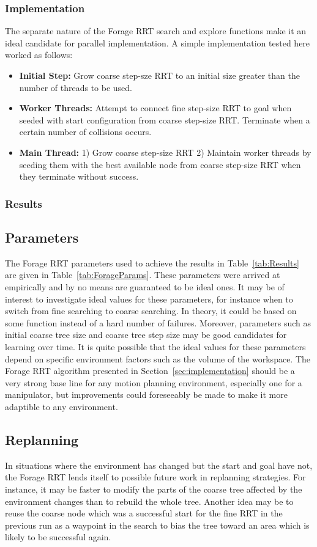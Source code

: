 \documentclass[conference]{IEEEtran}
\begin{document}
\subsubsection{Implementation}
The separate nature of the Forage RRT search and explore functions make it an ideal candidate for parallel implementation. A simple
implementation tested here worked as follows:
\begin{itemize}
\item \textbf{Initial Step: } Grow coarse step-sze RRT to an initial size greater than the number of threads to be used.
\item \textbf{Worker Threads: } Attempt to connect fine step-size RRT to goal when seeded with start configuration from coarse step-size
RRT. Terminate when a certain number of collisions occurs.
\item \textbf{Main Thread: } 1) Grow coarse step-size RRT 2) Maintain worker threads by seeding them with the best available node from
coarse step-size RRT when they terminate without success.
\end{itemize}

\subsubsection{Results}


\subsection{Parameters}
The Forage RRT parameters used to achieve the results in Table~\ref{tab:Results} are given in Table~\ref{tab:ForageParams}. These parameters
were arrived at empirically and by no means are guaranteed to be ideal ones. It may be of interest to investigate ideal values for these
parameters, for instance when to switch from fine searching to coarse searching. In theory, it could be based on some function instead of a
hard number of failures. Moreover, parameters such as initial coarse tree size and coarse tree step size may be good candidates for learning
over time. It is quite possible that the ideal values for these parameters depend on specific environment factors such as the volume of the
workspace. The Forage RRT algorithm presented in Section~\ref{sec:implementation} should be a very strong base line for any motion planning
environment, especially one for a manipulator, but improvements could foreseeably be made to make it more adaptible to any environment.

\subsection{Replanning}
In situations where the environment has changed but the start and goal have not, the Forage RRT lends itself to possible future work in
replanning strategies. For instance, it may be faster to modify the parts of the coarse tree affected by the environment changes than to
rebuild the whole tree. Another idea may be to reuse the coarse node which was a successful start for the fine RRT in the previous run as a
waypoint in the search to bias the tree toward an area which is likely to be successful again.
\end{document}
